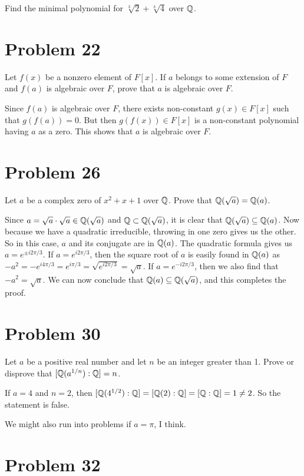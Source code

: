 \documentclass{article}
\begin{document}
Find the minimal polynomial for $\sqrt[3]{2}+\sqrt[3]{4}$ over $\mathbb{Q}$.

\section*{Problem 22}

Let $f(x)$ be a nonzero element of $F[x]$.
If $a$ belongs to some extension of $F$ and $f(a)$ is algebraic over $F$,
prove that $a$ is algebraic over $F$.

Since $f(a)$ is algebraic over $F$, there exists non-constant $g(x)\in F[x]$
such that $g(f(a))=0$.  But then $g(f(x))\in F[x]$ is a non-constant polynomial
having $a$ as a zero.  This shows that $a$ is algebraic over $F$.

\section*{Problem 26}

Let $a$ be a complex zero of $x^2+x+1$ over $\mathbb{Q}$.  Prove that $\mathbb{Q}(\sqrt{a})=\mathbb{Q}(a)$.

Since $a=\sqrt{a}\cdot\sqrt{a}\in\mathbb{Q}(\sqrt{a})$ and $\mathbb{Q}\subset\mathbb{Q}(\sqrt{a})$, it
is clear that $\mathbb{Q}(\sqrt{a})\subseteq\mathbb{Q}(a)$.
Now because we have a quadratic irreducible, throwing in one zero gives us the other.
So in this case, $a$ and its conjugate are in $\mathbb{Q}(a)$.
The quadratic formula gives us $a=e^{\pm i2\pi/3}$.  
If $a=e^{i2\pi/3}$, then the square root of $a$ is easily found
in $\mathbb{Q}(a)$ as $-a^2=-e^{i4\pi/3}=e^{i\pi/3}=\sqrt{e^{i2\pi/3}}=\sqrt{a}$.
If $a=e^{-i2\pi/3}$, then we also find that $-a^2=\sqrt{a}$.
We can now conclude that $\mathbb{Q}(a)\subseteq\mathbb{Q}(\sqrt{a})$, and this completes the proof.

\section*{Problem 30}

Let $a$ be a positive real number and let $n$ be an integer greater than 1.
Prove or disprove that $[\mathbb{Q}(a^{1/n}):\mathbb{Q}]=n$.

If $a=4$ and $n=2$, then $[\mathbb{Q}(4^{1/2}):\mathbb{Q}]=[\mathbb{Q}(2):\mathbb{Q}]=[\mathbb{Q}:\mathbb{Q}]=1\neq 2$.  So the
statement is false.

We might also run into problems if $a=\pi$, I think.

\section*{Problem 32}
\end{document}

